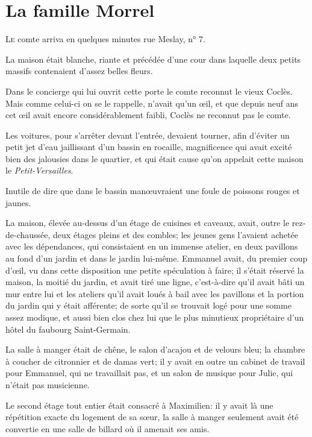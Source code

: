 \chapter{La famille Morrel}

\lettrine{L}{e} comte arriva en quelques minutes rue Meslay, n° 7. 

\zz
La maison était blanche, riante et précédée d'une cour dans laquelle deux petits massifs contenaient d'assez belles fleurs. 

\zz
Dans le concierge qui lui ouvrit cette porte le comte reconnut le vieux Coclès. Mais comme celui-ci on se le rappelle, n'avait qu'un œil, et que depuis neuf ans cet œil avait encore considérablement faibli, Coclès ne reconnut pas le comte. 

Les voitures, pour s'arrêter devant l'entrée, devaient tourner, afin d'éviter un petit jet d'eau jaillissant d'un bassin en rocaille, magnificence qui avait excité bien des jalousies dans le quartier, et qui était cause qu'on appelait cette maison le \textit{Petit-Versailles}. 

Inutile de dire que dans le bassin manœuvraient une foule de poissons rouges et jaunes. 

La maison, élevée au-dessus d'un étage de cuisines et caveaux, avait, outre le rez-de-chaussée, deux étages pleins et des combles; les jeunes gens l'avaient achetée avec les dépendances, qui consistaient en un immense atelier, en deux pavillons au fond d'un jardin et dans le jardin lui-même. Emmanuel avait, du premier coup d'œil, vu dans cette disposition une petite spéculation à faire; il s'était réservé la maison, la moitié du jardin, et avait tiré une ligne, c'est-à-dire qu'il avait bâti un mur entre lui et les ateliers qu'il avait loués à bail avec les pavillons et la portion du jardin qui y était afférente; de sorte qu'il se trouvait logé pour une somme assez modique, et aussi bien clos chez lui que le plus minutieux propriétaire d'un hôtel du faubourg Saint-Germain. 

La salle à manger était de chêne, le salon d'acajou et de velours bleu; la chambre à coucher de citronnier et de damas vert; il y avait en outre un cabinet de travail pour Emmanuel, qui ne travaillait pas, et un salon de musique pour Julie, qui n'était pas musicienne. 

Le second étage tout entier était consacré à Maximilien: il y avait là une répétition exacte du logement de sa sœur, la salle à manger seulement avait été convertie en une salle de billard où il amenait ses amis. 

